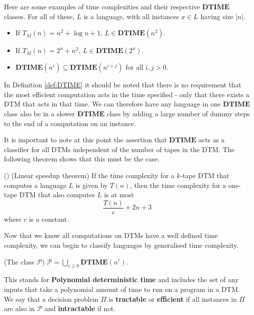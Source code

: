 \newpage
\begin{example}
    Here are some examples of time complexities and their respective $\mathbf{DTIME}$ classes. For all of these, $L$ is a language, with all instances $x \in L$ having size $|n|$.
    \begin{itemize}
        \item If $T_M(n) = n^2 + \log n +1$, $L \in \mathbf{DTIME}(n^2)$.
        \item If $T_M(n) = 2^n + n^2$, $L \in \mathbf{DTIME}(2^n)$.
        \item $\mathbf{DTIME}(n^i) \subseteq \mathbf{DTIME}(n^{i+j})$ for all $i,j > 0$.
    \end{itemize} 
\end{example}

\begin{remark}
    In Definition \ref{def:DTIME} it should be noted that there is no requirement that the most efficient computation acts in the time specified - only that there exists a DTM that acts in that time. We can therefore have any language in one $\mathbf{DTIME}$ class also be in a slower $\mathbf{DTIME}$ class by adding a large number of dummy steps to the end of a computation on an instance.
\end{remark}

It is important to note at this point the assertion that $\mathbf{DTIME}$ acts as a classifier for all DTMs independent of the number of tapes in the DTM. The following theorem shows that this must be the case.

\begin{theorem}
    (\cite{PapadimitriouChristosH1994Cc/C})
    (Linear speedup theorem) If the time complexity for a $k$-tape DTM that computes a language $L$ is given by $T(n)$, then the time complexity for a one-tape DTM that also computes $L$ is at most \[\frac{T(n)}{c} +2n + 3\] where $c$ is a constant.
\end{theorem}

Now that we know all computations on DTMs have a well defined time complexity, we can begin to classify languages by generalised time complexity.

\begin{definition}
    (The class $\mathcal{P}$) $\mathcal{P} = \bigcup_{c \geq 0} \mathbf{DTIME}(n^c)$.
\end{definition}

This stands for \textbf{Polynomial deterministic time} and includes the set of any inputs that take a polynomial amount of time to run on a program in a DTM. We say that a decision problem $\Pi$ is \textbf{tractable} or \textbf{efficient} if all instances in $\Pi$ are also in $\mathcal{P}$ and \textbf{intractable} if not.

